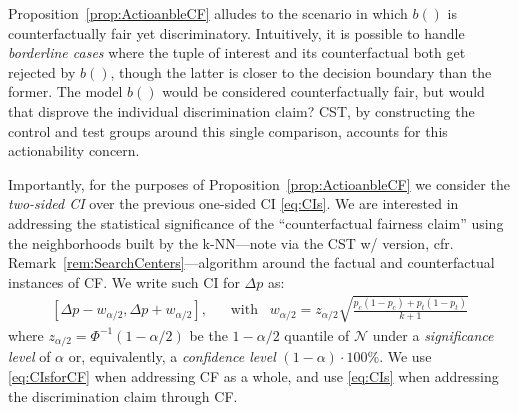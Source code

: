 Proposition~\ref{prop:ActioanbleCF} alludes to the scenario in which $b()$ is counterfactually fair yet discriminatory. 
Intuitively, it is possible to handle \textit{borderline cases} where the tuple of interest and its counterfactual both get rejected by $b()$, though the latter is closer to the decision boundary than the former. 
The model $b()$ would be considered counterfactually fair, but would that disprove the individual discrimination claim? 
CST, by constructing the control and test groups around this single comparison, accounts for this actionability concern.

Importantly, for the purposes of Proposition~\ref{prop:ActioanbleCF} we consider the \textit{two-sided CI} over the previous one-sided CI \eqref{eq:CIs}.
We are interested in addressing the statistical significance of the ``counterfactual fairness claim'' using the neighborhoods built by the k-NN---note via the CST w/ version, cfr. Remark~\ref{rem:SearchCenters}---algorithm around the factual and counterfactual instances of CF.
We write such CI for $\Delta p$ as:
%
\begin{align}
\label{eq:CIsforCF}
    [\Delta p - w_{\alpha/2}, \Delta p +  w_{\alpha/2}],
    & \; \; \; \text{with} \; \; \;
    w_{\alpha / 2} =  z_{\alpha / 2} \sqrt{\frac{p_c(1 - p_c) + p_t(1 - p_t)}{k + 1}}
\end{align}
%
where $z_{\alpha / 2} = \Phi^{-1}(1-\alpha / 2)$ be the $1-\alpha / 2$ quantile of $\mathcal{N}$ under a \textit{significance level} of $\alpha$ or, equivalently, a \textit{confidence level} $(1 - \alpha) \cdot 100$\%.
We use \eqref{eq:CIsforCF} when addressing CF as a whole, and use \eqref{eq:CIs} when addressing the discrimination claim through CF.



